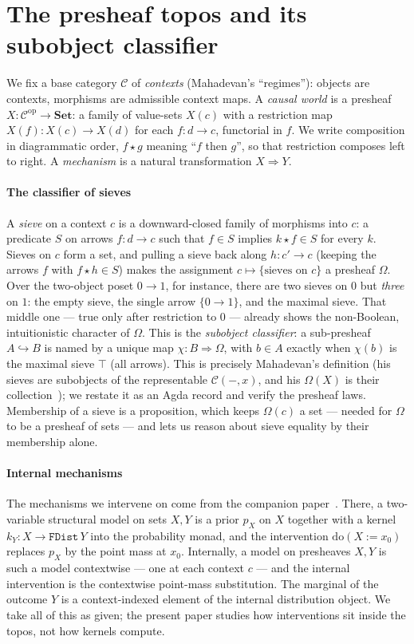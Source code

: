 \documentclass{lmcs}
\newcommand{\Om}{\Omega}
\newcommand{\Set}{\mathbf{Set}}
\newcommand{\dom}[2]{\mathrm{do}(#1\!:=\!#2)}
\begin{document}
\section{The presheaf topos and its subobject classifier}\label{sec:background}

We fix a base category $\mathcal{C}$ of \emph{contexts} (Mahadevan's ``regimes''): objects are contexts, morphisms are admissible context maps.
A \emph{causal world} is a presheaf $X : \mathcal{C}^{\mathrm{op}} \to \Set$: a family of value-sets $X(c)$ with a restriction map $X(f) : X(c) \to X(d)$ for each $f : d \to c$, functorial in $f$.
We write composition in diagrammatic order, $f \star g$ meaning ``$f$ then $g$'', so that restriction composes left to right.
A \emph{mechanism} is a natural transformation $X \Rightarrow Y$.

\paragraph{The classifier of sieves}
A \emph{sieve} on a context $c$ is a downward-closed family of morphisms into $c$: a predicate $S$ on arrows $f : d \to c$ such that $f \in S$ implies $k \star f \in S$ for every $k$.
Sieves on $c$ form a set, and pulling a sieve back along $h : c' \to c$ (keeping the arrows $f$ with $f \star h \in S$) makes the assignment $c \mapsto \{\text{sieves on } c\}$ a presheaf $\Om$.
Over the two-object poset $0 \to 1$, for instance, there are two sieves on $0$ but \emph{three} on $1$: the empty sieve, the single arrow $\{0 \to 1\}$, and the maximal sieve. That middle one --- true only after restriction to $0$ --- already shows the non-Boolean, intuitionistic character of $\Om$.
This is the \emph{subobject classifier}: a sub-presheaf $A \hookrightarrow B$ is named by a unique map $\chi : B \Rightarrow \Om$, with $b \in A$ exactly when $\chi(b)$ is the maximal sieve $\top$ (all arrows).
This is precisely Mahadevan's definition (his sieves are subobjects of the representable $\mathcal{C}(-,x)$, and his $\Om(X)$ is their collection~\cite[Def.~8,11]{mahadevan-2025c}); we restate it as an Agda record and verify the presheaf laws.
Membership of a sieve is a proposition, which keeps $\Om(c)$ a set --- needed for $\Om$ to be a presheaf of sets --- and lets us reason about sieve equality by their membership alone.

\paragraph{Internal mechanisms}
The mechanisms we intervene on come from the companion paper~\cite{sargsyan-cubical-dsep}.
There, a two-variable structural model on sets $X,Y$ is a prior $p_X$ on $X$ together with a kernel $k_Y : X \to \mathtt{FDist}\,Y$ into the probability monad, and the intervention $\dom{X}{x_0}$ replaces $p_X$ by the point mass at $x_0$.
Internally, a model on presheaves $X, Y$ is such a model contextwise --- one at each context $c$ --- and the internal intervention is the contextwise point-mass substitution.
The marginal of the outcome $Y$ is a context-indexed element of the internal distribution object.
We take all of this as given; the present paper studies how interventions sit inside the topos, not how kernels compute.
\end{document}
